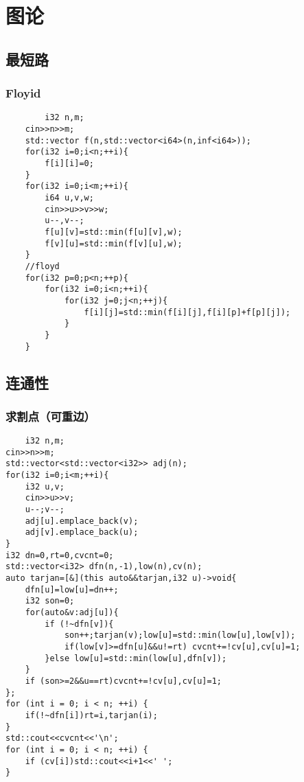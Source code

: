 \documentclass[UTF8]{ctexart}
\begin{document}
\section{图论}
\subsection{最短路}
\subsubsection{Floyid}
\begin{lstlisting}
        i32 n,m;
    cin>>n>>m;
    std::vector f(n,std::vector<i64>(n,inf<i64>));
    for(i32 i=0;i<n;++i){
        f[i][i]=0;
    }
    for(i32 i=0;i<m;++i){
        i64 u,v,w;
        cin>>u>>v>>w;
        u--,v--;
        f[u][v]=std::min(f[u][v],w);
        f[v][u]=std::min(f[v][u],w);
    }
    //floyd
    for(i32 p=0;p<n;++p){
        for(i32 i=0;i<n;++i){
            for(i32 j=0;j<n;++j){
                f[i][j]=std::min(f[i][j],f[i][p]+f[p][j]);
            }
        }
    }
\end{lstlisting}
\subsection{连通性}
\subsubsection{求割点（可重边）}
\begin{lstlisting}
    i32 n,m;
cin>>n>>m;
std::vector<std::vector<i32>> adj(n);
for(i32 i=0;i<m;++i){
    i32 u,v;
    cin>>u>>v;
    u--;v--;
    adj[u].emplace_back(v);
    adj[v].emplace_back(u);
}
i32 dn=0,rt=0,cvcnt=0;
std::vector<i32> dfn(n,-1),low(n),cv(n);
auto tarjan=[&](this auto&&tarjan,i32 u)->void{
    dfn[u]=low[u]=dn++;
    i32 son=0;
    for(auto&v:adj[u]){
        if (!~dfn[v]){
            son++;tarjan(v);low[u]=std::min(low[u],low[v]);
            if(low[v]>=dfn[u]&&u!=rt) cvcnt+=!cv[u],cv[u]=1;
        }else low[u]=std::min(low[u],dfn[v]);
    }
    if (son>=2&&u==rt)cvcnt+=!cv[u],cv[u]=1;
};
for (int i = 0; i < n; ++i) {
    if(!~dfn[i])rt=i,tarjan(i);
}
std::cout<<cvcnt<<'\n';
for (int i = 0; i < n; ++i) {
    if (cv[i])std::cout<<i+1<<' ';
}
\end{lstlisting}
\end{document}
